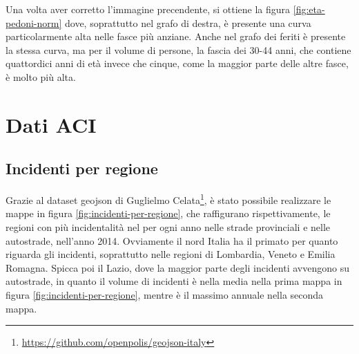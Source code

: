 \documentclass[a4paper]{report}
\begin{document}
Una volta aver corretto l'immagine precendente, si ottiene la figura \ref{fig:eta-pedoni-norm} dove, 
soprattutto nel grafo di destra, è presente una curva particolarmente alta nelle fasce più anziane.
Anche nel grafo dei feriti è presente la stessa curva, ma per il volume di persone, la fascia 
dei 30-44 anni, che contiene quattordici anni di età invece che cinque, come 
la maggior parte delle altre fasce, è molto più alta.







\section{Dati ACI}


\subsection{Incidenti per regione}

Grazie al dataset geojson di Guglielmo Celata\footnote{\url{https://github.com/openpolis/geojson-italy}}, 
è stato possibile realizzare le mappe in figura \ref{fig:incidenti-per-regione}, 
che raffigurano rispettivamente, le regioni con 
più incidentalità nel per ogni anno nelle strade provinciali e nelle autostrade, nell'anno 2014.
Ovviamente il nord Italia ha il primato per quanto riguarda gli incidenti, soprattutto nelle regioni 
di Lombardia, Veneto e Emilia Romagna. 
Spicca poi il Lazio, dove la maggior parte degli incidenti avvengono su autostrade, in quanto il volume 
di incidenti è nella media nella prima mappa in figura \ref{fig:incidenti-per-regione}, mentre è il massimo annuale nella 
seconda mappa.
\end{document}
